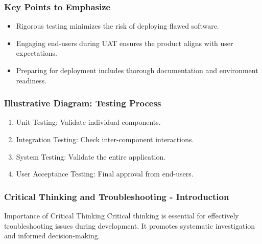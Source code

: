 \documentclass[aspectratio=169]{beamer}
\begin{document}
\begin{frame}[fragile]
    \frametitle{Key Points to Emphasize}
    \begin{itemize}
        \item Rigorous testing minimizes the risk of deploying flawed software.
        \item Engaging end-users during UAT ensures the product aligns with user expectations.
        \item Preparing for deployment includes thorough documentation and environment readiness.
    \end{itemize}
\end{frame}

\begin{frame}[fragile]
    \frametitle{Illustrative Diagram: Testing Process}
    \begin{enumerate}
        \item Unit Testing: Validate individual components.
        \item Integration Testing: Check inter-component interactions.
        \item System Testing: Validate the entire application.
        \item User Acceptance Testing: Final approval from end-users.
    \end{enumerate}
\end{frame}

\begin{frame}[fragile]
    \frametitle{Critical Thinking and Troubleshooting - Introduction}
    \begin{block}{Importance of Critical Thinking}
        Critical thinking is essential for effectively troubleshooting issues during development. It promotes systematic investigation and informed decision-making.
    \end{block}
\end{frame}
\end{document}
